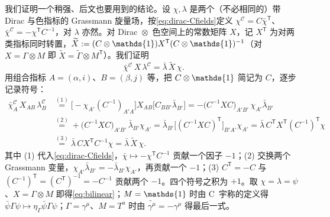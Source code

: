 \documentclass[UTF8,a4paper,11pt,fontset=fandol]{ctexart}
\makeatletter
\let\amsmathbb\mathbb
\renewcommand{\mathbb}[1]{\ifx1#1\mathds{1}\else\amsmathbb{#1}\fi}
\theoremstyle{cplain}
\theoremstyle{cdefinition}
\theoremstyle{cremark}
\renewcommand{\proofname}{证明}
\renewenvironment{proof}[1][\proofname]{\par\pushQED{\qed}\normalfont\topsep6\p@\@plus6\p@\relax
  \trivlist\item[\hskip\labelsep\itshape #1\hspace{0.5em}]\ignorespaces}{\popQED\endtrivlist\@endpefalse}
\numberwithin{equation}{section}
\newcommand{\tp}{\mathsf{T}}                         %
\newcommand{\Cop}{\mathcal{C}}                       %
\newcommand{\Cconj}[1]{\widetilde{#1}}              %
\makeatother
\begin{document}
\begin{proof}
我们证明一个稍强、后文也要用到的结论。设 $\chi,\lambda$ 是两个（不必相同的）带 Dirac 与色指标的 Grassmann 旋量场，按\cref{eq:dirac-Cfields}定义 $\chi^{\Cop}=C\bar\chi^{\tp}$、$\bar\chi^{\Cop}=-\chi^{\tp}C^{-1}$，对 $\lambda$ 亦然。对 Dirac~$\otimes$~色空间上的常数矩阵 $X$，记 $X^{\tp}$ 为对两类指标同时转置，$\Cconj X:=(C\otimes\mathbb 1)X^{\tp}(C\otimes\mathbb 1)^{-1}$（对 $X=\Gamma\otimes M$ 即 $\Cconj X=\Cconj\Gamma\otimes M^{\tp}$）。我们证明
\begin{equation}\label{eq:dirac-bilinear-general}
\bar\chi^{\Cop}\,X\,\lambda^{\Cop}=\bar\lambda\,\Cconj X\,\chi .
\end{equation}
用组合指标 $A=(\alpha,i)$、$B=(\beta,j)$ 等，把 $C\otimes\mathbb 1$ 简记为 $C$，逐步记录符号：
\begin{align*}
\bar\chi^{\Cop}_A\,X_{AB}\,\lambda^{\Cop}_B
&\overset{(1)}{=}\bigl[-\chi_{A'}(C^{-1})_{A'A}\bigr]X_{AB}\bigl[C_{BB'}\bar\lambda_{B'}\bigr]
=-\bigl(C^{-1}XC\bigr)_{A'B'}\,\chi_{A'}\bar\lambda_{B'}\\
&\overset{(2)}{=}+\bigl(C^{-1}XC\bigr)_{A'B'}\,\bar\lambda_{B'}\chi_{A'}
=\bar\lambda_{B'}\bigl[(C^{-1}XC)^{\tp}\bigr]_{B'A'}\chi_{A'}
=\bar\lambda\,C^{\tp}X^{\tp}(C^{-1})^{\tp}\chi\\
&\overset{(3)}{=}\bar\lambda\,CX^{\tp}C^{-1}\chi=\bar\lambda\,\Cconj X\,\chi .
\end{align*}
其中 (1) 代入\cref{eq:dirac-Cfields}，$\bar\chi\mapsto-\chi^{\tp}C^{-1}$ 贡献一个因子 $-1$；(2) 交换两个 Grassmann 变量，$\chi_{A'}\bar\lambda_{B'}=-\bar\lambda_{B'}\chi_{A'}$，再贡献一个 $-1$；(3) $C^{\tp}=-C$ 与 $(C^{-1})^{\tp}=(C^{\tp})^{-1}=-C^{-1}$ 贡献两个 $-1$。四个符号之积为 $+1$。取 $\chi=\lambda=\psi$、$X=\Gamma\otimes M$ 即得\cref{eq:bilinear}；$M=\mathbb 1$ 时由 C~宇称的定义得 $\bar\psi\Gamma\psi\mapsto\eta_\Gamma\bar\psi\Gamma\psi$；$\Gamma=\gamma^\mu$、$M=T^a$ 时由 $\Cconj{\gamma^\mu}=-\gamma^\mu$ 得最后一式。
\end{proof}
\end{document}

